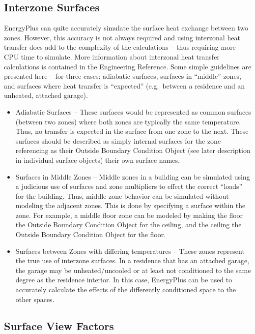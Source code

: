 \subsection{Interzone Surfaces}\label{interzone-surfaces}

EnergyPlus can quite accurately simulate the surface heat exchange between two zones. However, this accuracy is not always required and using interzonal heat transfer does add to the complexity of the calculations -- thus requiring more CPU time to simulate. More information about interzonal heat transfer calculations is contained in the Engineering Reference. Some simple guidelines are presented here -- for three cases: adiabatic surfaces, surfaces in ``middle'' zones, and surfaces where heat transfer is ``expected'' (e.g.~between a residence and an unheated, attached garage).

\begin{itemize}
\item
  Adiabatic Surfaces -- These surfaces would be represented as common surfaces (between two zones) where both zones are typically the same temperature. Thus, no transfer is expected in the surface from one zone to the next. These surfaces should be described as simply internal surfaces for the zone referencing as their Outside Boundary Condition Object (see later description in individual surface objects) their own surface names.
\item
  Surfaces in Middle Zones -- Middle zones in a building can be simulated using a judicious use of surfaces and zone multipliers to effect the correct ``loads'' for the building. Thus, middle zone behavior can be simulated without modeling the adjacent zones. This is done by specifying a surface within the zone. For example, a middle floor zone can be modeled by making the floor the Outside Boundary Condition Object for the ceiling, and the ceiling the Outside Boundary Condition Object for the floor.
\item
  Surfaces between Zones with differing temperatures -- These zones represent the true use of interzone surfaces. In a residence that has an attached garage, the garage may be unheated/uncooled or at least not conditioned to the same degree as the residence interior. In this case, EnergyPlus can be used to accurately calculate the effects of the differently conditioned space to the other spaces.
\end{itemize}

\subsection{Surface View Factors}\label{surface-view-factors}

